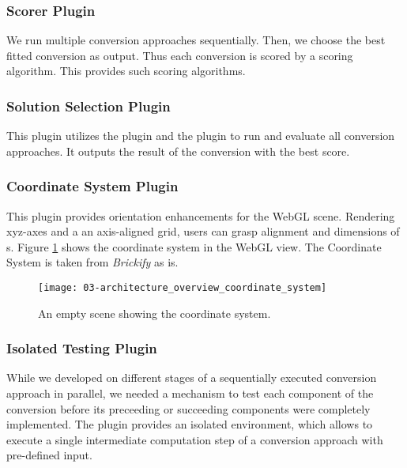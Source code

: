 \documentclass[../ClassicThesis.tex]{subfiles}
\begin{document}
\subsubsection{Scorer Plugin}

We run multiple conversion approaches sequentially. Then, we choose
the best fitted conversion as output. Thus each conversion
is scored by a scoring algorithm. This
 provides such scoring algorithms.

\subsubsection{Solution Selection Plugin}

This plugin utilizes the  plugin and
the  plugin to run and evaluate all conversion
approaches. It outputs the result of the conversion with the
best score.

\subsubsection{Coordinate System Plugin}

This plugin provides orientation enhancements for the WebGL
scene. Rendering xyz-axes and a an axis-aligned grid, users
can grasp alignment and dimensions of {\threedmodel}s.
Figure \ref{fig:architecture_overview_coordinate_system}
shows the coordinate system in the WebGL view. The
Coordinate System is taken from \emph{Brickify} as
is\cite{}.

\begin{figure}
  \texttt{[image: 03-architecture\_overview\_coordinate\_system]}
  \caption{An empty scene showing the coordinate system.}
  \label{fig:architecture_overview_coordinate_system}
\end{figure}

\subsubsection{Isolated Testing Plugin}

While we developed on different stages of a sequentially
executed conversion approach in parallel, we needed a
mechanism to test each component of the conversion before
its preceeding or succeeding components were completely
implemented. The  plugin provides an
isolated environment, which allows to execute a single
intermediate computation step of a conversion approach with
pre-defined input.
\end{document}
